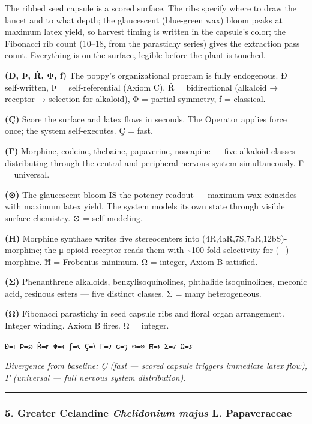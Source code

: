 The ribbed seed capsule is a scored surface. The ribs specify where to
draw the lancet and to what depth; the glaucescent (blue-green wax)
bloom peaks at maximum latex yield, so harvest timing is written in the
capsule's color; the Fibonacci rib count (10--18, from the parastichy
series) gives the extraction pass count. Everything is on the surface,
legible before the plant is touched.

\textbf{(Ð, Þ, Ř, Φ, ƒ)} The poppy's organizational program is fully
endogenous. Ð = self-written, Þ = self-referential (Axiom C), Ř =
bidirectional (alkaloid → receptor → selection for alkaloid), Φ =
partial symmetry, ƒ = classical.

\textbf{(Ç)} Score the surface and latex flows in seconds. The Operator
applies force once; the system self-executes. Ç = fast.

\textbf{(Γ)} Morphine, codeine, thebaine, papaverine, noscapine --- five
alkaloid classes distributing through the central and peripheral nervous
system simultaneously. Γ = universal.

\textbf{(⊙)} The glaucescent bloom IS the potency readout --- maximum
wax coincides with maximum latex yield. The system models its own state
through visible surface chemistry. ⊙ = self-modeling.

\textbf{(Ħ)} Morphine synthase writes five stereocenters into
(4R,4aR,7S,7aR,12bS)-morphine; the μ-opioid receptor reads them with
\textasciitilde100-fold selectivity for (−)-morphine. Ħ = Frobenius
minimum. Ω = integer, Axiom B satisfied.

\textbf{(Σ)} Phenanthrene alkaloids, benzylisoquinolines, phthalide
isoquinolines, meconic acid, resinous esters --- five distinct classes.
Σ = many heterogeneous.

\textbf{(Ω)} Fibonacci parastichy in seed capsule ribs and floral organ
arrangement. Integer winding. Axiom B fires. Ω = integer.

\texttt{Ð=𐑦\ Þ=𐑸\ Ř=𐑾\ Φ=𐑬\ ƒ=𐑱\ Ç=𐑘\ Γ=𐑲\ ɢ=𐑠\ ⊙=⊙\ Ħ=𐑶\ Σ=𐑳\ Ω=𐑭}

\emph{Divergence from baseline: Ç (fast --- scored capsule triggers
immediate latex flow), Γ (universal --- full nervous system
distribution).}

\begin{center}\rule{0.5\linewidth}{0.5pt}\end{center}

\hypertarget{greater-celandine-chelidonium-majus-l.-papaveraceae}{%
\subsubsection{\texorpdfstring{5. Greater Celandine \textbar{}
\emph{Chelidonium majus} L. \textbar{}
Papaveraceae}{5. Greater Celandine \textbar{} Chelidonium majus L. \textbar{} Papaveraceae}}\label{greater-celandine-chelidonium-majus-l.-papaveraceae}}

